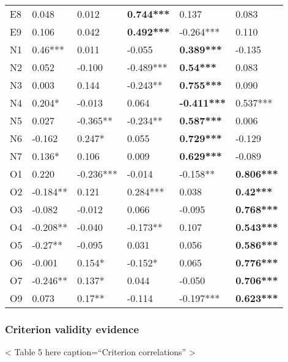 \documentclass[man]{apa6}
\theoremstyle{definition}
\theoremstyle{definition}
\theoremstyle{definition}
\theoremstyle{remark}
\begin{document}
\begin{table}[ht]
\begin{tabular}{llllll}
  E8 & 0.048 & 0.012 & \textbf{0.744***} & 0.137 & 0.083 \\ 
  E9 & 0.106 & 0.042 & \textbf{0.492***} & -0.264*** & 0.110 \\ 
  N1 & 0.46*** & 0.011 & -0.055 & \textbf{0.389***} & -0.135 \\ 
  N2 & 0.052 & -0.100 & -0.489*** & \textbf{0.54***} & 0.083 \\ 
  N3 & 0.003 & 0.144 & -0.243** & \textbf{0.755***} & 0.090 \\ 
  N4 & 0.204* & -0.013 & 0.064 & \textbf{-0.411***} & 0.537*** \\ 
  N5 & 0.027 & -0.365** & -0.234** & \textbf{0.587***} & 0.006 \\ 
  N6 & -0.162 & 0.247* & 0.055 & \textbf{0.729***} & -0.129 \\ 
  N7 & 0.136* & 0.106 & 0.009 & \textbf{0.629***} & -0.089 \\ 
  O1 & 0.220 & -0.236*** & -0.014 & -0.158** & \textbf{0.806***} \\ 
  O2 & -0.184** & 0.121 & 0.284*** & 0.038 & \textbf{0.42***} \\ 
  O3 & -0.082 & -0.012 & 0.066 & -0.095 & \textbf{0.768***} \\ 
  O4 & -0.208** & -0.040 & -0.173** & 0.107 & \textbf{0.543***} \\ 
  O5 & -0.27** & -0.095 & 0.031 & 0.056 & \textbf{0.586***} \\ 
  O6 & -0.001 & 0.154* & -0.152* & 0.065 & \textbf{0.776***} \\ 
  O7 & -0.246** & 0.137* & 0.044 & -0.050 & \textbf{0.706***} \\ 
  O9 & 0.073 & 0.17** & -0.114 & -0.197*** & \textbf{0.623***} \\ 
   \hline
\end{tabular}
\endgroup
\end{table}

\hypertarget{criterion-validity-evidence-1}{%
\subsubsection{Criterion validity
evidence}\label{criterion-validity-evidence-1}}

\textless{} Table 5 here caption=\enquote{Criterion correlations}
\textgreater{}
\end{document}
